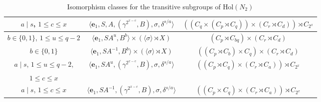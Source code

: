 \documentclass[a4paper,reqno]{amsart}
\theoremstyle{definition}
\newcommand{\e}{\textbf{e}}
\newcommand{\Hol}{\mathrm{Hol}}
\begin{document}
\begin{table}
{\begin{tabular}{|c|c|c|}
    \hline
    $a \mid s$, $1 \leq c \leq x$ & $\langle \e_1,S,A,(\gamma^{2^{x-c}},B), \sigma,\delta^{s/a} \rangle$ & $((C_q \times (C_p \rtimes C_q)) \times (C_r \rtimes C_d)) \rtimes C_{2^x}$\\
    \hline
    $b \in \{0,1\}$, $1 \leq u \leq q-2$ & $\langle \e_1,SA^u,B^b \rangle \times (\langle \sigma \rangle \rtimes X) $ & $(C_p \rtimes C_{bq}) \times (C_r \rtimes C_d)$ \\
    \hline
    $b \in \{0,1\}$ & $\langle \e_1,SA^{-1},B^b \rangle \times (\langle \sigma \rangle \rtimes X)$ & $((C_p \rtimes C_b) \times C_q) \times (C_r \rtimes C_d)$\\
    \hline
    $a \mid s$, $1 \leq u \leq q-2$, & $\langle \e_1,SA^u,(\gamma^{2^{x-c}},B),\sigma,\delta^{s/a} \rangle$ & $((C_p \rtimes C_q) \times (C_r \rtimes C_a)) \rtimes C_{2^x}$\\
    $1 \leq c \leq x$ & &\\
    \hline
    $a \mid s$, $1 \leq c \leq x$ & $\langle \e_1,SA^{-1},(\gamma^{2^{x-c}},B), \sigma,\delta^{s/a} \rangle$ & $((C_p \times C_q) \times (C_r \rtimes C_a)) \rtimes C_{2^x}$\\
    \hline
    \end{tabular}}
    \vskip5mm
    \caption{Isomorphism classes for the transitive subgroups of $\Hol(N_2)$}
    \label{N2_isom_classes}
\end{table}
\end{document}
